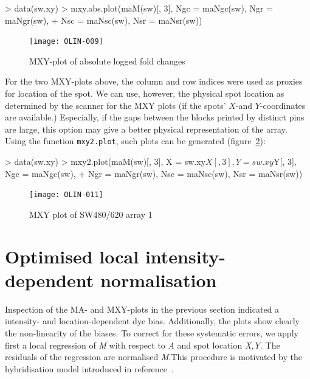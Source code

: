\documentclass[a4paper,11pt]{article}
\begin{document}
\begin{Schunk}
\begin{Sinput}
> data(sw.xy)
> mxy.abs.plot(maM(sw)[, 3], Ngc = maNgc(sw), Ngr = maNgr(sw), 
+     Nsc = maNsc(sw), Nsr = maNsr(sw))
\end{Sinput}
\end{Schunk}

\begin{figure}[t]
\centering
\texttt{[image: OLIN-009]}
\caption{MXY-plot of absolute logged fold changes}
\label{mxyabsplot}
\end{figure}


For the two MXY-plots above, the column and row indices were used as proxies for location 
of the spot. We can use, however, the physical spot location as determined by the 
scanner for the MXY plots (if the spots' $X$-and $Y$-coordinates are available.) 
Especially, if the gaps between the blocks printed by distinct pins are large,
this option may give a better physical representation of the array.
Using the function \texttt{mxy2.plot}, such plots can be generated (figure~\ref{mxy2plot}): 

\begin{Schunk}
\begin{Sinput}
> data(sw.xy)
> mxy2.plot(maM(sw)[, 3], X = sw.xy$X[, 3], Y = sw.xy$Y[, 3], Ngc = maNgc(sw), 
+     Ngr = maNgr(sw), Nsc = maNsc(sw), Nsr = maNsr(sw))
\end{Sinput}
\end{Schunk}

\begin{figure}[t]
\centering
\texttt{[image: OLIN-011]}
\caption{MXY plot of SW480/620 array 1}
\label{mxy2plot}
\end{figure}


\section{Optimised local intensity-dependent normalisation}
Inspection of the MA- and MXY-plots in the previous section indicated a intensity- and location-dependent dye 
bias. Additionally, the plots show clearly the non-linearity of the biases. To correct for these systematic errors,
 we apply first a local regression of \emph{M} with respect to \emph{A} and spot location \emph{X,Y}.
The residuals of the regression are normalised \emph{M}.This procedure is motivated by the hybridisation model introduced in reference~\cite{toni}.
\end{document}
